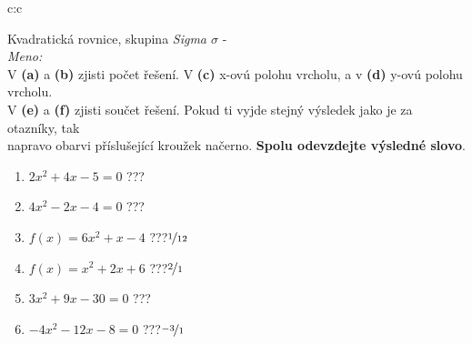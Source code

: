 \documentclass[10pt]{report}
\begin{document}
\clearpage
\thispagestyle{empty}
\begin{tabular}{c:c}
\begin{minipage}[c][99mm][t]{0.49\linewidth}
\begin{center}
\vspace{7mm}
{\huge Kvadratická rovnice, skupina \textit{Sigma $\sigma$} -}\\[4.5mm]
\textit{Meno:}\phantom{xxxxxxxxxxxxxxxxxxxxxxxxxxxxxxxxxxxxxxxxxxxxxxxxxxxxxxxxxxxxxxxxx}\\[3.5mm]
V \textbf{(a)} a \textbf{(b)} zjisti počet řešení. V \textbf{(c)} x-ovú polohu vrcholu, a v \textbf{(d)} y-ovú polohu vrcholu.\\V \textbf{(e)} a \textbf{(f)} zjisti součet řešení. Pokud ti vyjde stejný výsledek jako je za otazníky, tak\\napravo obarvi příslušející kroužek načerno. \textbf{Spolu odevzdejte výsledné slovo}.\\[3mm]
\begin{minipage}{0.77\linewidth}
\begin{center}
\begin{varwidth}{\textwidth}
\begin{enumerate}
\large
\item $2x^2+4x-5=0$\quad \dotfill\; ???\;\dotfill {}
\item $4x^2-2x-4=0$\quad \dotfill\; ???\;\dotfill {}
\item $f(x)=6x^2+x-4$\quad \dotfill\; ???\;\dotfill \quad $\nicefrac{1}{12}$
\item $f(x)=x^2+2x+6$\quad \dotfill\; ???\;\dotfill \quad $\nicefrac{2}{1}$
\item $3x^2+9x-30=0$\quad \dotfill\; ???\;\dotfill {}
\item $-4x^2-12x-8=0$\quad \dotfill\; ???\;\dotfill \quad $\nicefrac{-3}{1}$
\end{enumerate}
\end{varwidth}
\end{center}
\end{minipage}

\end{center}
\end{minipage}
\end{tabular}
\end{document}
